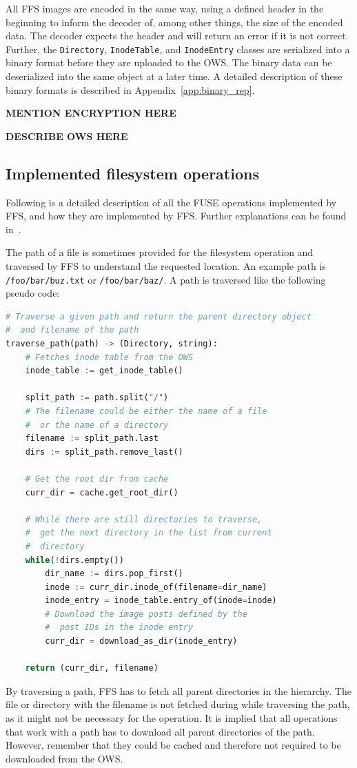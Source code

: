 All FFS images are encoded in the same way, using a defined header in the beginning to inform the decoder of, among other things, the size of the encoded data. The decoder expects the header and will return an error if it is not correct. Further, the \texttt{Directory}, \texttt{InodeTable}, and \texttt{InodeEntry} classes are serialized into a binary format before they are uploaded to the OWS. The binary data can be deserialized into the same object at a later time. A detailed description of these binary formats is described in Appendix~\ref{app:binary_rep}.

\textbf{MENTION ENCRYPTION HERE}


\textbf{DESCRIBE OWS HERE}


\subsection{Implemented filesystem operations}
\label{subsec:file_op}
Following is a detailed description of all the FUSE operations implemented by FFS, and how they are implemented by FFS. Further explanations can be found in \,\cite{kuenningCS135FUSEDocumentation2010}. 

The path of a file is sometimes provided for the filesystem operation and traversed by FFS to understand the requested location. An example path is \texttt{/foo/bar/buz.txt} or \texttt{/foo/bar/baz/}. A path is traversed like the following pseudo code:
\begin{lstlisting}[language=python, caption={Pseudocode of traversing a given path, returning the \texttt{Directory} and the filename}, label=lst:traverse_path,breaklines=true]
# Traverse a given path and return the parent directory object
#  and filename of the path
traverse_path(path) -> (Directory, string):
	# Fetches inode table from the OWS
	inode_table := get_inode_table()
	
	split_path := path.split("/")
	# The filename could be either the name of a file 
	#  or the name of a directory
	filename := split_path.last
	dirs := split_path.remove_last()

	# Get the root dir from cache
	curr_dir = cache.get_root_dir()

	# While there are still directories to traverse,
	#  get the next directory in the list from current
	#  directory
	while(!dirs.empty())
		dir_name := dirs.pop_first()
		inode := curr_dir.inode_of(filename=dir_name)
		inode_entry = inode_table.entry_of(inode=inode)
		# Download the image posts defined by the 
		#  post IDs in the inode entry
		curr_dir = download_as_dir(inode_entry)
	
	return (curr_dir, filename)

\end{lstlisting}
By traversing a path, FFS has to fetch all parent directories in the hierarchy. The file or directory with the filename is not fetched during while traversing the path, as it might not be necessary for the operation. It is implied that all operations that work with a path has to download all parent directories of the path. However, remember that they could be cached and therefore not required to be downloaded from the OWS. 

